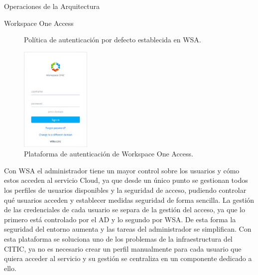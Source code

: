 \begin{subsection}{Operaciones de la Arquitectura}
\begin{subsubsection}{Workspace One Access}
\begin{figure}[h]
            \caption{Política de autenticación por defecto establecida en WSA.}
            \label{fig:default-policy}
        \end{figure}
        \FloatBarrier
        \begin{figure}[h]
            \centering
            \includegraphics[width=0.3\textwidth]{imaxes/pruebaconcepto/vrealize/wsa-login.png}
            \caption{Plataforma de autenticación de Workspace One Access.}
            \label{fig:wsa-platform}
        \end{figure}
        \FloatBarrier        
        Con WSA el administrador tiene un mayor control sobre los usuarios y cómo estos acceden al servicio Cloud, ya que desde un único punto se gestionan todos los perfiles de usuarios disponibles y la seguridad de acceso, pudiendo controlar qué usuarios acceden y establecer medidas seguridad de forma sencilla. La gestión de las credenciales de cada usuario se separa de la gestión del acceso, ya que lo primero está controlado por el AD y lo segundo por WSA. De esta forma la seguridad del entorno aumenta y las tareas del administrador se simplifican. Con esta plataforma se soluciona uno de los problemas de la infraestructura del CITIC, ya no es necesario crear un perfil manualmente para cada usuario que quiera acceder al servicio y su gestión se centraliza en un componente dedicado a ello.



\end{subsubsection}
\end{subsection}

